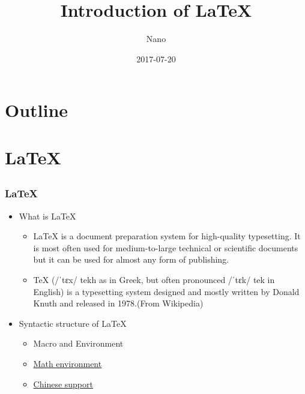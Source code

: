 \documentclass[10pt]{beamer}
\begin{document}
\begin{CJK*}{UTF8}{gbsn}
\title {\bfseries{\sc Introduction of \LaTeX}}
\author[Nano]{Nano}
\date{\small 2017-07-20} 
\begin{frame}
\titlepage
\end{frame}
\section*{Outline}
\begin{frame}
\frametitle{}  
\tableofcontents
\end{frame}

\section{\LaTeX}
    \subsection{}
    \subsection{}
\begin{frame}
\frametitle{\LaTeX}
    \begin{itemize}
    \item {What is {\LaTeX}}
        \begin{itemize}
            \item LaTeX is a document preparation system for high-quality typesetting. It is most often used for medium-to-large technical or scientific documents but it can be used for almost any form of publishing.
            \item TeX (/ˈtɛx/ tekh as in Greek, but often pronounced /ˈtɛk/ tek in English) is a typesetting system designed and mostly written by Donald Knuth and released in 1978.(From Wikipedia)
        \end{itemize}
    \item {Syntactic structure of \LaTeX}
        \begin{itemize}
            \item Macro and Environment
            \item \href{https://www.sharelatex.com/learn/Mathematical_expressions}{Math environment}
            \item \href{https://www.sharelatex.com/learn/Chinese}{Chinese support}
        \end{itemize}
    \end{itemize}
\end{frame}

\end{CJK*}
\end{document}
